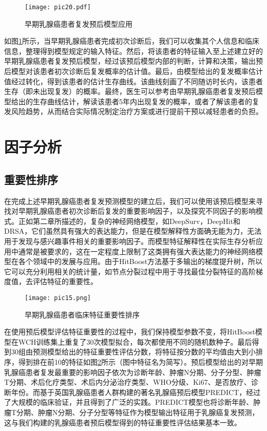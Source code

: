 \begin{figure}[H]
\texttt{[image: pic20.pdf]}
\caption{早期乳腺癌患者复发预后模型应用}
\label{pic20}
\end{figure}

如图\ref{pic20}所示，当早期乳腺癌患者完成初次诊断后，我们可以收集其个人信息和临床信息，整理得到模型规定的输入特征。然后，将该患者的特征输入至上述建立好的早期乳腺癌患者复发预后模型，经过该预后模型内部的判断，计算和决策，输出预后模型对该患者初次诊断后复发概率的估计值。最后，由模型给出的复发概率估计值经过转化，得到该患者的估计生存曲线。该曲线刻画了不同随访时长内，该患者生存（即未出现复发）的概率。最终，医生可以参考由早期乳腺癌患者复发预后模型给出的生存曲线估计，解读该患者5年内出现复发的概率，或者了解该患者的复发风险趋势，从而结合实际情况制定治疗方案或进行提前干预以减轻患者的负担。

\section{因子分析}

\subsection{重要性排序}

在完成上述早期乳腺癌患者复发预测模型的建立后，我们可以使用该预后模型来寻找对早期乳腺癌患者初次诊断后复发的重要影响因子，以及探究不同因子的影响模式。正如第二章所描述的，复杂的神经网络模型，如DeepSurv，DeepHit和DRSA，它们虽然具有强大的表达能力，但是在模型解释性方面确无能为力，无法用于发现与感兴趣事件相关的重要影响因子。而模型特征解释性在实际生存分析应用中通常是被要求的，这在一定程度上限制了这类拥有强大表达能力的神经网络模型在各个领域中的发展与应用。由于HitBoost方法基于多输出的梯度提升树，所以它可以充分利用相关的统计量，如节点分裂过程中用于寻找最佳分裂特征的高阶梯度值，去评估特征的重要性。

\begin{figure}[H]
\texttt{[image: pic15.png]}
\caption{早期乳腺癌患者临床特征重要性排序}
\label{pic15}
\end{figure}

在使用预后模型评估特征重要性的过程中，我们保持模型参数不变，将HitBoost模型在WCH训练集上重复了30次模型拟合，每次都使用不同的随机数种子。最后得到30组由预测模型给出的特征重要性评估分数，将特征按分数的平均值由大到小排序，得到排在前10的特征如图\ref{pic15}所示（图中特征名为简写）。预后模型给出的对早期乳腺癌患者复发最重要的影响因子依次为诊断年龄、肿瘤N分期、分子分型、肿瘤T分期、术后化疗类型、术后内分泌治疗类型、WHO分级、Ki67、是否放疗、诊断年份。而基于英国乳腺癌患者人群构建的著名乳腺癌预后模型PREDICT，经过了大规模的临床验证，并且得到了广泛的实践。PREDICT模型也将诊断年龄、肿瘤T分期、肿瘤N分期、分子分型等特征作为模型输出特征用于乳腺癌复发预测，这与我们构建的乳腺癌患者预后模型得到的特征重要性评估结果基本一致。

